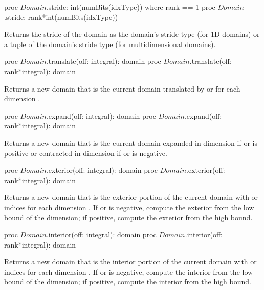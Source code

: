 \begin{protohead}
proc $Domain$.stride: int(numBits(idxType)) where rank == 1
proc $Domain$.stride: rank*int(numBits(idxType))
\end{protohead}
\begin{protobody}
Returns the stride of the domain as the domain's stride type (for 1D
domains) or a tuple of the domain's stride type (for multidimensional
domains).
\end{protobody}

\begin{protohead}
proc $Domain$.translate(off: integral): domain
proc $Domain$.translate(off: rank*integral): domain
\end{protohead}
\begin{protobody}
Returns a new domain that is the current domain translated
by  or  for each dimension .
\end{protobody}

\begin{protohead}
proc $Domain$.expand(off: integral): domain
proc $Domain$.expand(off: rank*integral): domain
\end{protohead}
\begin{protobody}
Returns a new domain that is the current domain expanded in
dimension  if  or  is positive or
contracted in dimension  if  or  is
negative.
\end{protobody}

\begin{protohead}
proc $Domain$.exterior(off: integral): domain
proc $Domain$.exterior(off: rank*integral): domain
\end{protohead}
\begin{protobody}
Returns a new domain that is the exterior portion of the current
domain with  or  indices for each
dimension .  If  or  is negative,
compute the exterior from the low bound of the dimension; if positive,
compute the exterior from the high bound.
\end{protobody}

\begin{protohead}
proc $Domain$.interior(off: integral): domain
proc $Domain$.interior(off: rank*integral): domain
\end{protohead}
\begin{protobody}
Returns a new domain that is the interior portion of the current
domain with  or  indices for each
dimension .  If  or  is negative,
compute the interior from the low bound of the dimension; if positive,
compute the interior from the high bound.
\end{protobody}

